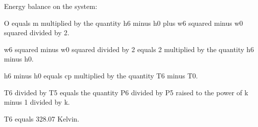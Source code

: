 Energy balance on the system:  

O equals m multiplied by the quantity h6 minus h0 plus w6 squared minus w0 squared divided by 2.  

w6 squared minus w0 squared divided by 2 equals 2 multiplied by the quantity h6 minus h0.  

h6 minus h0 equals cp multiplied by the quantity T6 minus T0.  

T6 divided by T5 equals the quantity P6 divided by P5 raised to the power of k minus 1 divided by k.  

T6 equals 328.07 Kelvin.